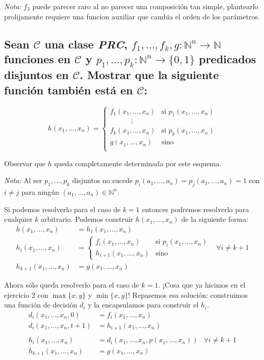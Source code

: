 \documentclass[fleqn, 11pt]{article}
\newcommand{\nat}{\mathbb{N}}
\newcommand{\Ccur}{\mathcal{C}}
\begin{document}
\emph{Nota:} $f_3$ puede parecer raro al no parecer una composición tan simple,
plantearlo prolijamente requiere una funcion auxiliar que cambia el orden de
los parámetros.

\subsection{Sean $\Ccur$ una clase \emph{PRC}, $f_1, \dots, f_k,
g:\nat^n\to\nat$ funciones en $\Ccur$ y $p_1, \dots, p_k: \nat^n \to \{0, 1\}$
predicados disjuntos en $\Ccur$. Mostrar que la siguiente función también está
en $\Ccur$:}

\[
	h(x_1, \dots, x_n) =
	\begin{cases}
		f_1(x_1, \dots, x_n) & \text{si } p_1(x_1, \dots, x_n) \\
		\hspace{3em}\vdots \\
		f_k(x_1, \dots, x_n) & \text{si } p_k(x_1, \dots, x_n) \\
		g(x_1, \dots, x_n) & \text{sino} \\
	\end{cases}
\]

Observar que $h$ queda completamente determinada por este esquema.

\emph{Nota:} Al ser $p_1, \dots, p_k$ disjuntos no sucede $p_i(a_1, \dots, a_n)
= p_j(a_1, \dots, a_n) = 1$ con $i \neq j$ para ningún
$(a_1, \dots, a_n) \in \nat^n$.

Si podemos resolverlo para el caso de $k=1$ entonces podremos resolverlo para
cualquier $k$ arbitrario. Podemos construir $h(x_1, \dots, x_n)$ de la
siguiente forma:
\begin{align*}
	h(x_1, \dots, x_n)   &= h_1(x_1, \dots, x_n) \\
	h_i(x_1, \dots, x_n) &=
	\begin{cases}
		f_i(x_1, \dots, x_n) & \text{si } p_i(x_1, \dots, x_n) \\
		h_{i + 1}(x_1, \dots, x_n) & \text{sino}
	\end{cases} & \forall i \neq k+1 \\
	h_{k + 1}(x_1, \dots, x_n) &= g(x_1, \dots, x_n)
\end{align*}

Ahora sólo queda resolverlo para el caso de $k = 1$. ¡Cosa que ya hicimos en el
ejercicio 2 con $\max\{x, y\}$ y $\min\{x, y\}$! Repasemos esa solución:
construimos una función de decisión $d_i$ y la encapsulamos para construir el
$h_i$.
\begin{align*}
	d_i(x_1, \dots, x_n, 0)     &= f_i(x_1, \dots, x_n) \\
	d_i(x_1, \dots, x_n, t + 1) &= h_{i + 1}(x_1, \dots, x_n) \\
	\\
	h_i(x_1, \dots, x_n)        &= d_i(x_1, \dots, x_n, p(x_1, \dots, x_n))
	& \forall i \neq k+1 \\
	h_{k+1}(x_1, \dots, x_n)    &= g(x_1, \dots, x_n)
\end{align*}
\end{document}

